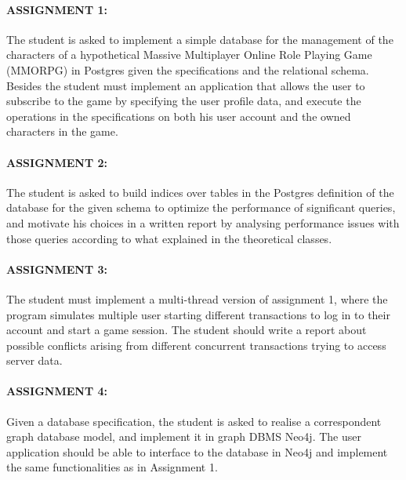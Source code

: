 \paragraph{ASSIGNMENT 1:}
The student is asked to implement a simple database for the management of the characters of a hypothetical Massive Multiplayer Online Role Playing Game (MMORPG) in Postgres given the specifications and the relational schema. Besides the student must implement an application that allows the user to subscribe to the game by specifying the user profile data, and execute the operations in the specifications on both his user account and the owned characters in the game.

\paragraph{ASSIGNMENT 2:}
The student is asked to build indices over tables in the Postgres definition of the database for the given schema to optimize the performance of significant queries, and motivate his choices in a written report by analysing performance issues with those queries according to what explained in the theoretical classes.

\paragraph{ASSIGNMENT 3:}
The student must implement a multi-thread version of assignment 1, where the program simulates multiple user starting different transactions to log in to their account and start a game session. The student should write a report about possible conflicts arising from different concurrent transactions trying to access server data.

\paragraph{ASSIGNMENT 4:}
Given a database specification, the student is asked to realise a correspondent graph database model, and implement it in graph DBMS Neo4j. The user application should be able to interface to the database in Neo4j and implement the same functionalities as in Assignment 1.
